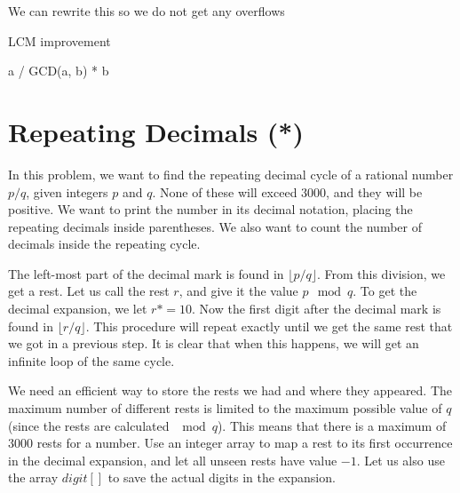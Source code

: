\documentclass[11pt,a4paper,twoside]{article}
\begin{document}
We can rewrite this so we do not get any overflows

\begin{algorithm}
    \caption{LCM improvement}
    \label{LCM improvement}
    \begin{algorithmic}
        \STATE a / GCD(a, b) * b
    \end{algorithmic}
\end{algorithm}





\section{Repeating Decimals (*)}

In this problem, we want to find the repeating decimal cycle of a rational
number $p/q$, given integers $p$ and $q$. None of these will exceed $3000$, and
they will be positive. We want to print the number in its decimal notation,
placing the repeating decimals inside parentheses. We also want to count the
number of decimals inside the repeating cycle.

The left-most part of the decimal mark is found in $\lfloor{p/q}\rfloor$. From this
division, we get a rest. Let us call the rest $r$, and give it the value $p
\mod q$. To get the decimal expansion, we let $r *= 10$. Now the first digit
after the decimal mark is found in $\lfloor{r/q}\rfloor$. This procedure will repeat
exactly until we get the same rest that we got in a previous step. It is clear
that when this happens, we will get an infinite loop of the same cycle.

We need an efficient way to store the rests we had and where they appeared. The
maximum number of different rests is limited to the maximum possible value of
$q$ (since the rests are calculated $\mod q$). This means that there is a
maximum of $3000$ rests for a number. Use an integer array to map a rest to its
first occurrence in the decimal expansion, and let all unseen rests have value
$-1$.  Let us also use the array $digit[]$ to save the actual digits in the
expansion.

       
\end{document}

